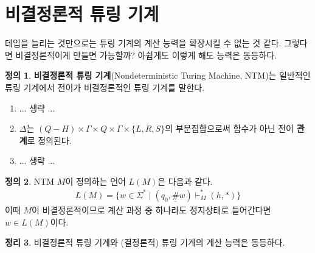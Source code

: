 \documentclass[b5paper, 11pt]{book}
\theoremstyle{definition}
\newtheorem{defn}{정의}[chapter]
\newtheorem{thm}[defn]{정리}
\begin{document}
\section{비결정론적 튜링 기계}
테입을 늘리는 것만으로는 튜링 기계의 계산 능력을 확장시킬 수 없는 것 같다. 그렇다면 비결정론적이게 만들면 가능할까? 아쉽게도 이렇게 해도 능력은 동등하다.
\begin{defn}
\textbf{비결정론적 튜링 기계}(Nondeterministic Turing Machine, NTM)는 일반적인 튜링 기계에서 전이가 비결정론적인 튜링 기계를 말한다. 
\begin{enumerate}
    \item $\ldots$ 생략 $\ldots$ \item $\Delta$는 $(Q-H) \times \Gamma \times Q \times \Gamma \times \{L, R, S\}$의 부분집합으로써 함수가 아닌 전이 \textbf{관계}로 정의된다. \item $\ldots$ 생략 $\ldots$
\end{enumerate}
\end{defn}
\begin{defn}
    NTM $M$이 정의하는 언어 $L(M)$은 다음과 같다.
    \begin{align*}
        L(M) = \{w \in \Sigma^* \;\vert\; (q_0, \underline{\#}w) \vdash_M^* (h, *)\}
    \end{align*}
    이때 $M$이 비결정론적이므로 계산 과정 중 하나라도 정지상태로 들어간다면 $w \in L(M)$이다. 
\end{defn}
\begin{thm} \label{NTM pf}
    비결정론적 튜링 기계와 (결정론적) 튜링 기계의 계산 능력은 동등하다. 
\end{thm}
\end{document}
